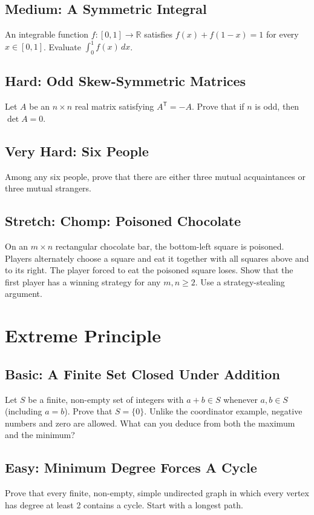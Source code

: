 \documentclass[12pt]{article}
\begin{document}
\subsection*{Medium: A Symmetric Integral}
An integrable function $f:[0,1]\to\mathbb{R}$ satisfies
$f(x)+f(1-x)=1$ for every $x\in[0,1]$. Evaluate
$\int_0^1 f(x)\,dx$.

\subsection*{Hard: Odd Skew-Symmetric Matrices}
Let $A$ be an $n\times n$ real matrix satisfying $A^{\mathsf T}=-A$.
Prove that if $n$ is odd, then $\det A=0$.

\subsection*{Very Hard: Six People}
Among any six people, prove that there are either three mutual
acquaintances or three mutual strangers.

\subsection*{Stretch: Chomp: Poisoned Chocolate}
On an $m\times n$ rectangular chocolate bar, the bottom-left square is
poisoned. Players alternately choose a square and eat it together with
all squares above and to its right. The player forced to eat the
poisoned square loses. Show that the first player has a winning
strategy for any $m,n\ge2$. Use a strategy-stealing argument.

\section{Extreme Principle}

\subsection*{Basic: A Finite Set Closed Under Addition}
Let $S$ be a finite, non-empty set of integers with $a+b\in S$ whenever
$a,b\in S$ (including $a=b$). Prove that $S=\{0\}$.
Unlike the coordinator example, negative numbers and zero are allowed.
What can you deduce from both the maximum and the minimum?

\subsection*{Easy: Minimum Degree Forces A Cycle}
Prove that every finite, non-empty, simple undirected graph in which
every vertex has degree at least 2 contains a cycle. Start with a
longest path.
\end{document}
